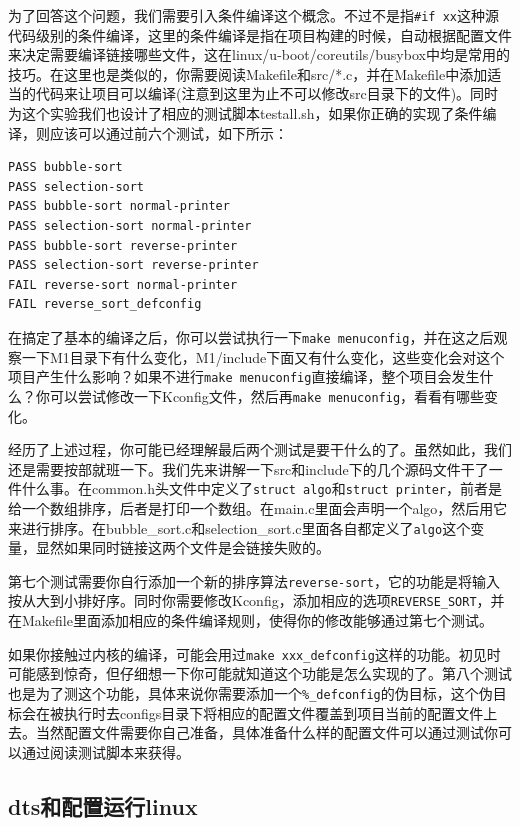 \documentclass[lang=cn,11pt,a4paper]{elegantpaper}
\begin{document}
为了回答这个问题，我们需要引入条件编译这个概念。不过不是指\lstinline!#if xx!这种源代码级别的条件编译，这里的条件编译是指在项目构建的时候，自动根据配置文件来决定需要编译链接哪些文件，这在linux/u-boot/coreutils/busybox中均是常用的技巧。在这里也是类似的，你需要阅读Makefile和src/*.c，并在Makefile中添加适当的代码来让项目可以编译(注意到这里为止不可以修改src目录下的文件)。同时为这个实验我们也设计了相应的测试脚本testall.sh，如果你正确的实现了条件编译，则应该可以通过前六个测试，如下所示：
\begin{lstlisting}
PASS bubble-sort
PASS selection-sort
PASS bubble-sort normal-printer
PASS selection-sort normal-printer
PASS bubble-sort reverse-printer
PASS selection-sort reverse-printer
FAIL reverse-sort normal-printer
FAIL reverse_sort_defconfig
\end{lstlisting}

在搞定了基本的编译之后，你可以尝试执行一下\lstinline!make menuconfig!，并在这之后观察一下M1目录下有什么变化，M1/include下面又有什么变化，这些变化会对这个项目产生什么影响？如果不进行\lstinline!make menuconfig!直接编译，整个项目会发生什么？你可以尝试修改一下Kconfig文件，然后再\lstinline!make menuconfig!，看看有哪些变化。

经历了上述过程，你可能已经理解最后两个测试是要干什么的了。虽然如此，我们还是需要按部就班一下。我们先来讲解一下src和include下的几个源码文件干了一件什么事。在common.h头文件中定义了\lstinline!struct algo!和\lstinline!struct printer!，前者是给一个数组排序，后者是打印一个数组。在main.c里面会声明一个algo，然后用它来进行排序。在bubble\_sort.c和selection\_sort.c里面各自都定义了\lstinline!algo!这个变量，显然如果同时链接这两个文件是会链接失败的。

第七个测试需要你自行添加一个新的排序算法\lstinline!reverse-sort!，它的功能是将输入按从大到小排好序。同时你需要修改Kconfig，添加相应的选项\lstinline!REVERSE_SORT!，并在Makefile里面添加相应的条件编译规则，使得你的修改能够通过第七个测试。

如果你接触过内核的编译，可能会用过\lstinline!make xxx_defconfig!这样的功能。初见时可能感到惊奇，但仔细想一下你可能就知道这个功能是怎么实现的了。第八个测试也是为了测这个功能，具体来说你需要添加一个\lstinline!%_defconfig!的伪目标，这个伪目标会在被执行时去configs目录下将相应的配置文件覆盖到项目当前的配置文件上去。当然配置文件需要你自己准备，具体准备什么样的配置文件可以通过测试你可以通过阅读测试脚本来获得。

\subsection{dts和配置运行linux}
\end{document}
